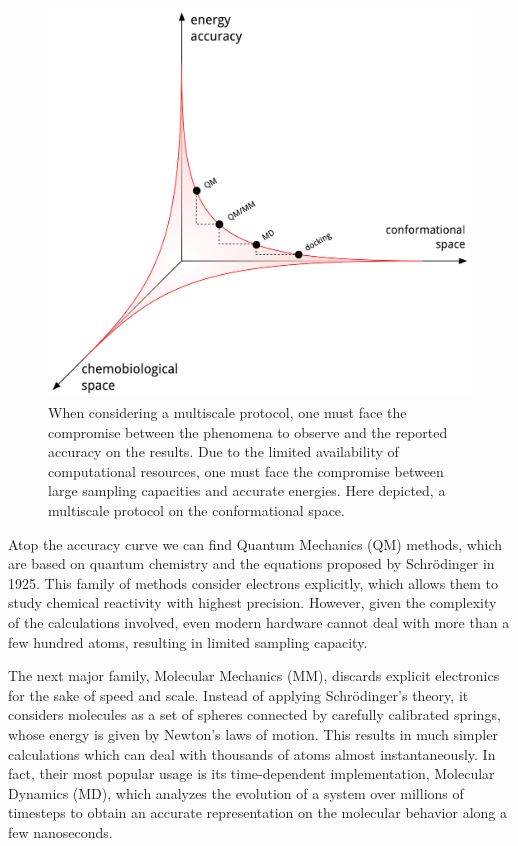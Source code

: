 \begin{figure}
		\includegraphics[width=\textwidth]{./figures/01/thong.pdf}
		\cprotect\caption[Accuracy vs visitable space in multiscale modeling]{When considering a multiscale protocol, one must face the compromise between the phenomena to observe and the reported accuracy on the results. Due to the limited availability of computational resources, one must face the compromise between large sampling capacities and accurate energies. Here depicted, a multiscale protocol on the conformational space.}
		\label{fig:multiscalethong}
\end{figure}


Atop the accuracy curve we can find Quantum Mechanics (QM) methods, which are based on quantum chemistry and the equations proposed by Schrödinger in 1925. This family of methods consider electrons explicitly, which allows them to study chemical reactivity with highest precision. However, given the complexity of the calculations involved, even modern hardware cannot deal with more than a few hundred atoms, resulting in limited sampling capacity.

The next major family, Molecular Mechanics (MM), discards explicit electronics for the sake of speed and scale. Instead of applying Schrödinger's theory, it considers molecules as a set of spheres connected by carefully calibrated springs, whose energy is given by Newton's laws of motion. This results in much simpler calculations which can deal with thousands of atoms almost instantaneously. In fact, their most popular usage is its time-dependent implementation, Molecular Dynamics (MD), which analyzes the evolution of a system over millions of timesteps to obtain an accurate representation on the molecular behavior along a few nanoseconds.


